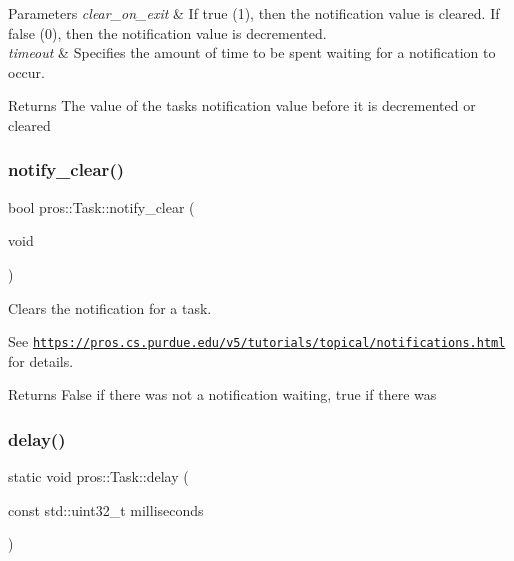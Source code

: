 \begin{DoxyParams}{Parameters}
{\em clear\+\_\+on\+\_\+exit} & If true (1), then the notification value is cleared. If false (0), then the notification value is decremented. \\
\hline
{\em timeout} & Specifies the amount of time to be spent waiting for a notification to occur.\\
\hline
\end{DoxyParams}
\begin{DoxyReturn}{Returns}
The value of the task\textquotesingle{}s notification value before it is decremented or cleared 
\end{DoxyReturn}
\mbox{\label{classpros_1_1Task_a6fc6c97f2dd9fc92b6b9ff47557f215f}} 
\subsubsection{\texorpdfstring{notify\+\_\+clear()}{notify\_clear()}}
{\footnotesize\ttfamily bool pros\+::\+Task\+::notify\+\_\+clear (\begin{DoxyParamCaption}\item[{void}]{ }\end{DoxyParamCaption})}



Clears the notification for a task. 

See \href{https://pros.cs.purdue.edu/v5/tutorials/topical/notifications.html}{\tt https\+://pros.\+cs.\+purdue.\+edu/v5/tutorials/topical/notifications.\+html} for details.

\begin{DoxyReturn}{Returns}
False if there was not a notification waiting, true if there was 
\end{DoxyReturn}
\mbox{\label{classpros_1_1Task_a4341b580544831eea11b840cf068587b}} 
\subsubsection{\texorpdfstring{delay()}{delay()}}
{\footnotesize\ttfamily static void pros\+::\+Task\+::delay (\begin{DoxyParamCaption}\item[{const std\+::uint32\+\_\+t}]{milliseconds }\end{DoxyParamCaption})\hspace{0.3cm}{\ttfamily [static]}}




